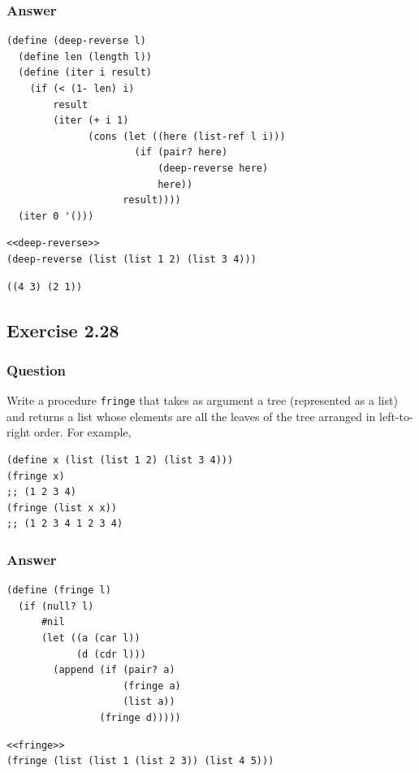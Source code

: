 \documentclass[final,fleqn,titlepage,twoside]{article}
\begin{document}
\subsubsection{Answer}
\label{sec:org750cbf4}
\begin{verbatim}
(define (deep-reverse l)
  (define len (length l))
  (define (iter i result)
    (if (< (1- len) i)
        result
        (iter (+ i 1)
              (cons (let ((here (list-ref l i)))
                      (if (pair? here)
                          (deep-reverse here)
                          here))
                    result))))
  (iter 0 '()))
\end{verbatim}
\begin{verbatim}
<<deep-reverse>>
(deep-reverse (list (list 1 2) (list 3 4)))
\end{verbatim}

\begin{verbatim}
((4 3) (2 1))
\end{verbatim}

\subsection{Exercise 2.28}
\label{sec:org8abaea4}
\subsubsection{Question}
\label{sec:org57487f3}
Write a procedure \texttt{fringe} that takes as argument a tree (represented
as a list) and returns a list whose elements are all the leaves of the tree
arranged in left-to-right order. For example,

\begin{verbatim}
(define x (list (list 1 2) (list 3 4)))
(fringe x)
;; (1 2 3 4)
(fringe (list x x))
;; (1 2 3 4 1 2 3 4)
\end{verbatim}

\subsubsection{Answer}
\label{sec:org627b443}
\begin{verbatim}
(define (fringe l)
  (if (null? l)
      #nil
      (let ((a (car l))
            (d (cdr l)))
        (append (if (pair? a)
                    (fringe a)
                    (list a))
                (fringe d)))))
\end{verbatim}
\begin{verbatim}
<<fringe>>
(fringe (list (list 1 (list 2 3)) (list 4 5)))
\end{verbatim}
\end{document}
